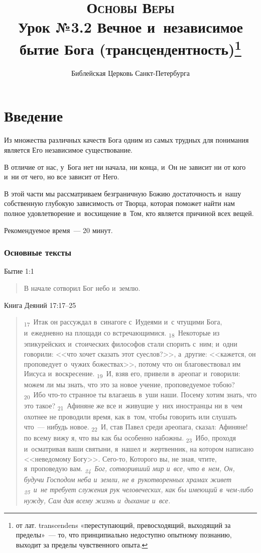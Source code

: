 \documentclass[a4paper,12pt]{article}
\title{\textsc{Основы Веры}\\Урок №3.2 Вечное и~независимое бытие Бога (трансцендентность)\footnote{от лат. transcendens «переступающий, превосходящий, выходящий за пределы»~--- то, что принципиально недоступно опытному познанию, выходит за пределы чувственного опыта.} }
\author{Библейская Церковь Санкт-Петербурга}
\date{}
\begin{document}
\maketitle

\thispagestyle{empty}

\tableofcontents



\section*{Введение}

Из множества различных качеств Бога одним из самых трудных для понимания является Его независимое существование.

В отличие от нас, у~Бога нет ни начала, ни конца, и~Он не зависит ни от кого и~ни от чего, но все зависит от Него.

В этой части мы рассматриваем безграничную Божию достаточность и~нашу собственную глубокую зависимость от Творца, которая поможет найти нам полное удовлетворение и~восхищение в~Том, кто является причиной всех вещей.

Рекомендуемое время~--- 20 минут.
        
\subsubsection*{Основные тексты}

\noindent Бытие 1:1

\begin{quote}
    В начале сотворил Бог небо и~землю.
\end{quote}

\noindent Книга Деяний 17:17--25

\begin{quote}
\textsubscript{17}~Итак он рассуждал в~синагоге с~Иудеями и~с чтущими Бога, и~ежедневно на площади со встречающимися. 
\textsubscript{18}~Некоторые из эпикурейских и~стоических философов стали спорить с~ним; и~одни говорили: <<что хочет сказать этот суеслов?>>, а~другие: <<кажется, он проповедует о~чужих божествах>>, потому что он благовествовал им Иисуса и~воскресение. 
\textsubscript{19}~И, взяв его, привели в~ареопаг и~говорили: можем ли мы знать, что это за новое учение, проповедуемое тобою? 
\textsubscript{20}~Ибо что-то странное ты влагаешь в~уши наши. Посему хотим знать, что это такое? 
\textsubscript{21}~Афиняне же все и~живущие у~них иностранцы ни в~чем охотнее не проводили время, как в~том, чтобы говорить или слушать что~--- нибудь новое. 
\textsubscript{22}~И, став Павел среди ареопага, сказал: Афиняне! по всему вижу я, что вы как бы особенно набожны. 
\textsubscript{23}~Ибо, проходя и~осматривая ваши святыни, я~нашел и~жертвенник, на котором написано <<неведомому Богу>>. Сего-то, Которого вы, не зная, чтите, я~проповедую вам. 
\emph{\textsubscript{24}~Бог, сотворивший мир и~все, что в~нем, Он, будучи Господом неба и~земли, не в~рукотворенных храмах живет 
\textsubscript{25}~и~не требует служения рук человеческих, как бы имеющий в~чем-либо нужду, Сам дая всему жизнь и~дыхание и~все.}
\end{quote}
\end{document}
